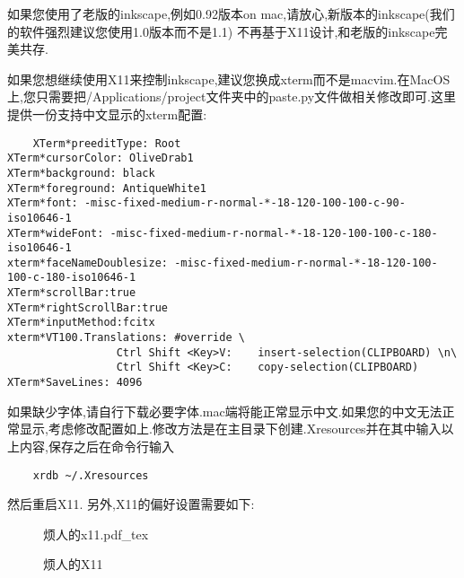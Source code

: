 \documentclass[AutoFakeBold,letterpaper,12pt,hidelinks]{article}
\newcommand{\incfig}[1]{%
    \def\svgwidth{\columnwidth}
    {#1.pdf_tex}
}
\begin{document}
如果您使用了老版的inkscape,例如0.92版本on mac,请放心,新版本的inkscape(我们的软件强烈建议您使用1.0版本而不是1.1) 不再基于X11设计,和老版的inkscape完美共存.

如果您想继续使用X11来控制inkscape,建议您换成xterm而不是macvim.在MacOS上,您只需要把/Applications/project文件夹中的paste.py文件做相关修改即可.这里提供一份支持中文显示的xterm配置:

\begin{verbatim}
	XTerm*preeditType: Root
XTerm*cursorColor: OliveDrab1
XTerm*background: black
XTerm*foreground: AntiqueWhite1
XTerm*font: -misc-fixed-medium-r-normal-*-18-120-100-100-c-90-iso10646-1
XTerm*wideFont: -misc-fixed-medium-r-normal-*-18-120-100-100-c-180-iso10646-1
xterm*faceNameDoublesize: -misc-fixed-medium-r-normal-*-18-120-100-100-c-180-iso10646-1
XTerm*scrollBar:true
XTerm*rightScrollBar:true
XTerm*inputMethod:fcitx
xterm*VT100.Translations: #override \
                 Ctrl Shift <Key>V:    insert-selection(CLIPBOARD) \n\
                 Ctrl Shift <Key>C:    copy-selection(CLIPBOARD)
XTerm*SaveLines: 4096
\end{verbatim}
如果缺少字体,请自行下载必要字体.mac端将能正常显示中文.如果您的中文无法正常显示,考虑修改配置如上.修改方法是在主目录下创建.Xresources并在其中输入以上内容,保存之后在命令行输入
\begin{verbatim}
	xrdb ~/.Xresources 
\end{verbatim}

然后重启X11.
另外,X11的偏好设置需要如下:
\begin{figure}[H]
    \centering
    \incfig{烦人的x11}
    \caption{烦人的X11}
    \label{fig:烦人的x11}
\end{figure}
\end{document}

